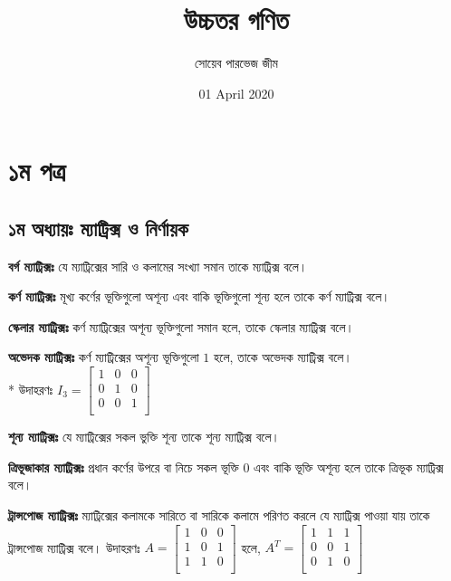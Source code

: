 \documentclass[a4paper,12pt]{article}
\title {উচ্চতর গণিত}
\author{সোয়েব পারভেজ জীম}
\date{01 April 2020}
\renewcommand{\baselinestretch}{1.3}
\begin{document}
\maketitle

\hypersetup{hidelinks}

\begingroup
    \renewcommand{\baselinestretch}{1}
    \tableofcontents
\endgroup


\thispagestyle{empty}
\addtocounter{page}{-2}
\clearpage\mbox{}\thispagestyle{empty}\clearpage

\section{১ম পত্র}
\subsection{১ম অধ্যায়ঃ ম্যাট্রিক্স ও নির্ণায়ক}

\textbf{বর্গ ম্যাট্রিক্সঃ} যে ম্যাট্রিক্সের সারি ও কলামের সংখ্যা সমান তাকে ম্যাট্রিক্স বলে। 

\textbf{কর্ণ ম্যাট্রিক্সঃ} মূখ্য কর্ণের ভূক্তিগুলো অশূন্য এবং বাকি ভূক্তিগুলো শূন্য হলে তাকে কর্ণ ম্যাট্রিক্স বলে। 

\textbf{স্কেলার ম্যাট্রিক্সঃ} কর্ণ ম্যাট্রিক্সের অশূন্য ভূক্তিগুলো সমান হলে, তাকে স্কেলার ম্যাট্রিক্স বলে।

\textbf{অভেদক ম্যাট্রিক্সঃ} কর্ণ ম্যাট্রিক্সের অশূন্য ভূক্তিগুলো $1$ হলে, তাকে অভেদক ম্যাট্রিক্স বলে। \\*
উদাহরণঃ $I_3 = \begin{bmatrix}
    1 & 0 & 0\\
    0 & 1 & 0\\
    0 & 0 & 1\\
    \end{bmatrix}$

\textbf{শূন্য ম্যাট্রিক্সঃ} যে ম্যাট্রিক্সের সকল ভুক্তি শূন্য তাকে শূন্য ম্যাট্রিক্স বলে। 

\textbf{ত্রিভূজাকার ম্যাট্রিক্সঃ} প্রধান কর্ণের উপরে বা নিচে সকল ভূক্তি $0$ এবং বাকি ভূক্তি অশূন্য হলে তাকে ত্রিভূক ম্যাট্রিক্স বলে। 

\textbf{ট্রান্সপোজ ম্যাট্রিক্সঃ} ম্যাট্রিক্সের কলামকে সারিতে বা সারিকে কলামে পরিণত করলে যে ম্যাট্রিক্স পাওয়া যায় তাকে ট্রান্সপোজ ম্যাট্রিক্স বলে। উদাহরণঃ $A=\begin{bmatrix}
    1 & 0 & 0\\
    1 & 0 & 1\\
    1 & 1 & 0\\
    \end{bmatrix}$ হলে, $A^T= \begin{bmatrix}
        1 & 1 & 1\\
        0 & 0 & 1\\
        0 & 1 & 0\\
        \end{bmatrix}$
\end{document}
